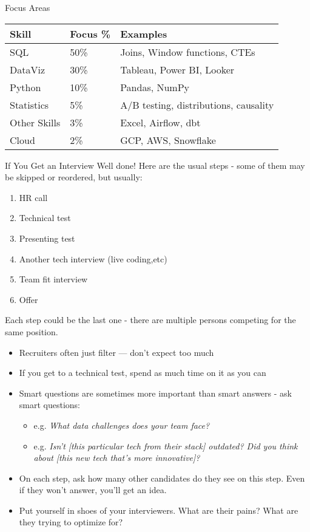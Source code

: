 \documentclass[10pt,a4paper]{article}
\begin{document}
\begin{multicols}{3}
\begin{textbox}{Focus Areas}
\begin{tabular}{l|l|l}
\textbf{Skill} & \textbf{Focus \%} & \textbf{Examples} \\
\hline
SQL & 50\% & Joins, Window functions, CTEs \\
DataViz & 30\% & Tableau, Power BI, Looker \\
Python & 10\% & Pandas, NumPy \\
Statistics & 5\% & A/B testing, distributions, causality \\
Other Skills & 3\% & Excel, Airflow, dbt \\
Cloud & 2\% & GCP, AWS, Snowflake \\
\end{tabular}
\end{textbox}
\begin{textboxGreen}{If You Get an Interview}
Well done! Here are the usual steps - some of them may be skipped or reordered, but usually:
   \begin{enumerate}
        \item HR call
        \item Technical test
        \item Presenting test
        \item Another tech interview (live coding,etc)
        \item Team fit interview
        \item Offer
    \end{enumerate}
Each step could be the last one - there are multiple persons competing for the same position.
\begin{itemize}
    \item Recruiters often just filter — don't expect too much
    \item If you get to a technical test, spend as much time on it as you can
    \item Smart questions are sometimes more important than smart answers - ask smart questions:
    \begin{itemize}
        \item e.g. \emph{What data challenges does your team face?}
        \item e.g. \emph{Isn't [this particular tech from their stack] outdated? Did you think about [this new tech that's more innovative]?}
    \end{itemize}
    \item On each step, ask how many other candidates do they see on this step. Even if they won't answer, you'll get an idea.
    \item Put yourself in shoes of your interviewers. What are their pains? What are they trying to optimize for?
\end{itemize}
\end{textboxGreen}



\end{multicols}
\end{document}
